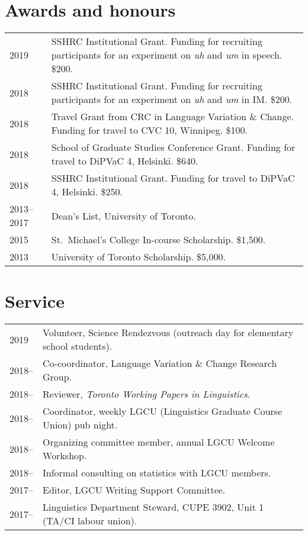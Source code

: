 \documentclass[letterpaper]{article}
\begin{document}
\section*{Awards and honours}
\begin{longtable}{p{}p{}}
    2019 & SSHRC Institutional Grant. Funding for recruiting participants for an
    experiment on \emph{uh} and \emph{um} in speech. \$200. \\
    2018 & SSHRC Institutional Grant. Funding for recruiting participants for an
    experiment on \emph{uh} and \emph{um} in IM. \$200. \\
    2018 & Travel Grant from CRC in Language Variation \& Change.  Funding for
    travel to CVC 10, Winnipeg. \$100. \\
    2018 & School of Graduate Studies Conference Grant. Funding for travel to
    DiPVaC 4, Helsinki. \$640. \\
    2018 & SSHRC Institutional Grant. Funding for travel to DiPVaC 4, Helsinki.
    \$250. \\
    2013--2017 & Dean's List, University of Toronto. \\
    2015 & St.\ Michael's College In-course Scholarship. \$1,500. \\
    2013 & University of Toronto Scholarship. \$5,000. \\
\end{longtable}

\section*{Service}
\begin{longtable}{p{}p{}}
    2019   & Volunteer, Science Rendezvous (outreach day for elementary school
    students). \\
    2018-- & Co-coordinator, Language Variation \& Change Research Group. \\
    2018-- & Reviewer, \textit{Toronto Working Papers in Linguistics}. \\
    2018-- & Coordinator, weekly LGCU (Linguistics Graduate Course Union) pub
    night. \\
    2018-- & Organizing committee member, annual LGCU Welcome Workshop. \\
    2018-- & Informal consulting on statistics with LGCU members. \\
    2017-- & Editor, LGCU Writing Support Committee. \\
    2017-- & Linguistics Department Steward, CUPE 3902, Unit 1 (TA/CI labour
    union). \\
\end{longtable}
\end{document}
